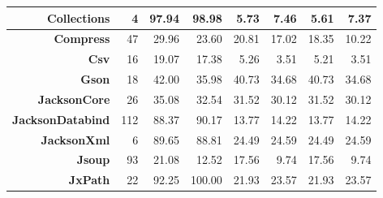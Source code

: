 \begin{table}[h!]
{\begin{tabular}{|r|r|rr|rr|rr|}
            \textbf{Collections}                    & 4                                      & \multicolumn{1}{r|}{97.94} & 98.98                 & \multicolumn{1}{r|}{5.73}  & 7.46                  & \multicolumn{1}{r|}{5.61}  & 7.37                  \\ \hline
            \textbf{Compress}                       & 47                                     & \multicolumn{1}{r|}{29.96} & 23.60                 & \multicolumn{1}{r|}{20.81} & 17.02                 & \multicolumn{1}{r|}{18.35} & 10.22                 \\ \hline
            \textbf{Csv}                            & 16                                     & \multicolumn{1}{r|}{19.07} & 17.38                 & \multicolumn{1}{r|}{5.26}  & 3.51                  & \multicolumn{1}{r|}{5.21}  & 3.51                  \\ \hline
            \textbf{Gson}                           & 18                                     & \multicolumn{1}{r|}{42.00} & 35.98                 & \multicolumn{1}{r|}{40.73} & 34.68                 & \multicolumn{1}{r|}{40.73} & 34.68                 \\ \hline
            \textbf{JacksonCore}                    & 26                                     & \multicolumn{1}{r|}{35.08} & 32.54                 & \multicolumn{1}{r|}{31.52} & 30.12                 & \multicolumn{1}{r|}{31.52} & 30.12                 \\ \hline
            \textbf{JacksonDatabind}                & 112                                    & \multicolumn{1}{r|}{88.37} & 90.17                 & \multicolumn{1}{r|}{13.77} & 14.22                 & \multicolumn{1}{r|}{13.77} & 14.22                 \\ \hline
            \textbf{JacksonXml}                     & 6                                      & \multicolumn{1}{r|}{89.65} & 88.81                 & \multicolumn{1}{r|}{24.49} & 24.59                 & \multicolumn{1}{r|}{24.49} & 24.59                 \\ \hline
            \textbf{Jsoup}                          & 93                                     & \multicolumn{1}{r|}{21.08} & 12.52                 & \multicolumn{1}{r|}{17.56} & 9.74                  & \multicolumn{1}{r|}{17.56} & 9.74                  \\ \hline
            \textbf{JxPath}                         & 22                                     & \multicolumn{1}{r|}{92.25} & 100.00                & \multicolumn{1}{r|}{21.93} & 23.57                 & \multicolumn{1}{r|}{21.93} & 23.57                 \\ \hline

\end{tabular}}
\end{table}
